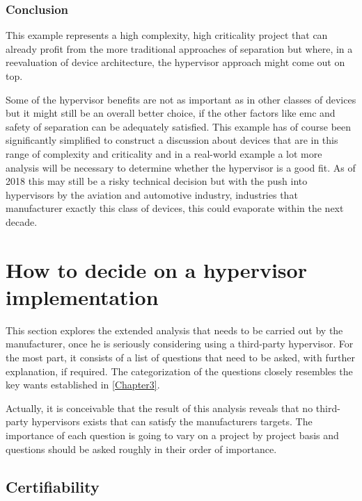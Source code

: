 \subsubsection{Conclusion}
This example represents a high complexity, high criticality project that can already profit from the more traditional approaches of separation but where, in a reevaluation of device architecture, the hypervisor approach might come out on top. 

Some of the hypervisor benefits are not as important as in other classes of devices but it might still be an overall better choice, if the other factors like \acrshort{emc} and safety of separation can be adequately satisfied. This example has of course been significantly simplified to construct a discussion about devices that are in this range of complexity and criticality and in a real-world example a lot more analysis will be necessary to determine whether the hypervisor is a good fit. As of 2018 this may still be a risky technical decision but with the push into hypervisors by the aviation and automotive industry, industries that manufacturer exactly this class of devices, this could evaporate within the next decade.


\section{How to decide on a hypervisor implementation} \label{how-to-decide}
This section explores the extended analysis that needs to be carried out by the manufacturer, once he is seriously considering using a third-party hypervisor. For the most part, it consists of a list of questions that need to be asked, with further explanation, if required. The categorization of the questions closely resembles the key wants established in \ref{Chapter3}.

Actually, it is conceivable that the result of this analysis reveals that no third-party hypervisors exists that can satisfy the manufacturers targets. The importance of each question is going to vary on a project by project basis and questions should be asked roughly in their order of importance. 

\subsection{Certifiability}
